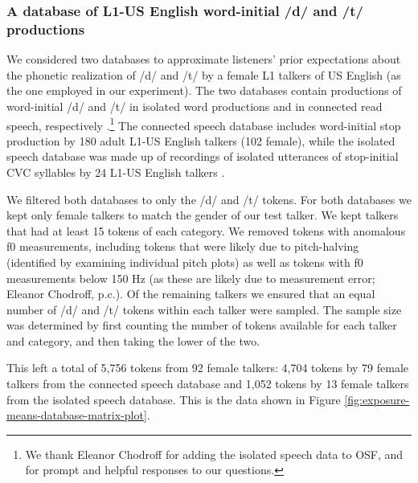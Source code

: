 \documentclass[
  11pt,
  man,mask,floatsintext]{apa6}
\begin{document}
\subsubsection{A database of L1-US English word-initial /d/ and /t/ productions}\label{sec:phonetic-database}

We considered two databases to approximate listeners' prior expectations about the phonetic realization of /d/ and /t/ by a female L1 talkers of US English (as the one employed in our experiment). The two databases contain productions of word-initial /d/ and /t/ in isolated word productions and in connected read speech, respectively \autocite[available on OSF at \url{https://osf.io/k6djr/}]{chodroff-wilson2017}.\footnote{We thank Eleanor Chodroff for adding the isolated speech data to OSF, and for prompt and helpful responses to our questions.} The connected speech database includes word-initial stop production by 180 adult L1-US English talkers (102 female), while the isolated speech database was made up of recordings of isolated utterances of stop-initial CVC syllables by 24 L1-US English talkers \autocite[13 female, see][ pp.~33, 37- 39 for details]{chodroff-wilson2017}.

We filtered both databases to only the /d/ and /t/ tokens. For both databases we kept only female talkers to match the gender of our test talker. We kept talkers that had at least 15 tokens of each category. We removed tokens with anomalous f0 measurements, including tokens that were likely due to pitch-halving (identified by examining individual pitch plots) as well as tokens with f0 measurements below 150 Hz (as these are likely due to measurement error; Eleanor Chodroff, p.c.). Of the remaining talkers we ensured that an equal number of /d/ and /t/ tokens within each talker were sampled. The sample size was determined by first counting the number of tokens available for each talker and category, and then taking the lower of the two.

This left a total of 5,756 tokens from 92 female talkers: 4,704 tokens by 79 female talkers from the connected speech database and 1,052 tokens by 13 female talkers from the isolated speech database. This is the data shown in Figure \ref{fig:exposure-means-database-matrix-plot}.
\end{document}
